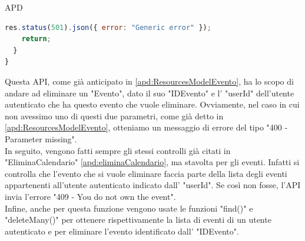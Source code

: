 \begin{listaPersonale} {APD}
\begin{listaPersonale2}[APD]{}
\begin{lstlisting}[language=JavaScript]
    res.status(501).json({ error: "Generic error" });
    return;
  }
}
                \end{lstlisting}
                Questa API, come già anticipato in \ref{apd:ResourcesModelEvento}, ha lo scopo di andare ad eliminare un "Evento", dato il suo "IDEvento" e l' "userId" dell'utente autenticato che ha questo evento che vuole eliminare. Ovviamente, nel caso in cui non avessimo uno di questi due parametri, come già detto in \ref{apd:ResourcesModelEvento}, otteniamo un messaggio di errore del tipo "400 - Parameter missing". \\
                In seguito, vengono fatti sempre gli stessi controlli già citati in "EliminaCalendario" \ref{apd:eliminaCalendario}, ma stavolta per gli eventi. Infatti si controlla che l'evento che si vuole eliminare faccia parte della lista degli eventi appartenenti all'utente autenticato indicato dall' "userId". Se così non fosse, l'API invia l'errore "409 - You do not own the event". \\
                Infine, anche per questa funzione vengono usate le funzioni "find()" e "deleteMany()" per ottenere rispettivamente la lista di eventi di un utente autenticato e per eliminare l'evento identificato dall' "IDEvento".

\end{listaPersonale2}
\end{listaPersonale}
